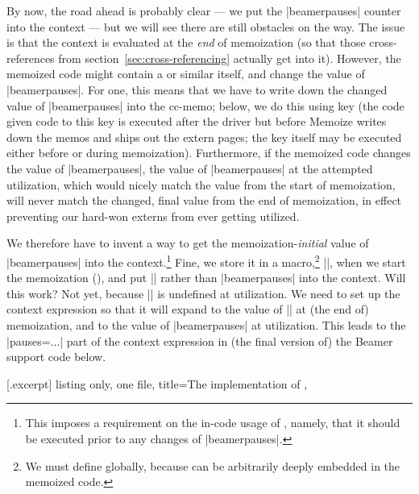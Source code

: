 \documentclass[a4paper,11pt]{article}
\begin{document}
By now, the road ahead is probably clear --- we put the |beamerpauses| counter
into the context --- but we will see there are still obstacles on the way.  The
issue is that the context is evaluated at the \emph{end} of memoization (so
that those cross-references from section~\ref{sec:cross-referencing} actually
get into it).  However, the memoized code might contain a  or similar
itself, and change the value of |beamerpauses|.  For one, this means that we
have to write down the changed value of |beamerpauses| into the cc-memo; below,
we do this using key  (the code given code to this
key is executed after the driver but before Memoize writes down the memos and
ships out the extern pages; the key itself may be executed either before or
during memoization).  Furthermore, if the memoized code changes the value of
|beamerpauses|, the value of |beamerpauses| at the attempted utilization, which
would nicely match the value from the start of memoization, will never match
the changed, final value from the end of memoization, in effect preventing our
hard-won externs from ever getting utilized.

We therefore have to invent a way to get the memoization-\emph{initial} value
of |beamerpauses| into the context.\footnote{This imposes a requirement on the
  in-code usage of , namely, that it should be executed
  prior to any changes of |beamerpauses|.}  Fine, we store it in a
macro,\footnote{We must define  globally, because
   can be arbitrarily deeply embedded in the memoized
  code.} |\mmzBeamerPauses|, when we start the memoization (), and put |\mmzBeamerPauses| rather than |beamerpauses| into the
context.  Will this work?  Not yet, because |\mmzBeamerPauses| is undefined at
utilization.  We need to set up the context expression so that it will expand
to the value of |\mmzBeamerPauses| at (the end of) memoization, and to the
value of |beamerpauses| at utilization.  This leads to the
|pauses=\ifmemoizing...| part of the context expression in (the final version
  of) the Beamer support code below.

\medskip %

[.excerpt]{%
  listing only, one file,
  title={The implementation of },
}
\end{document}
